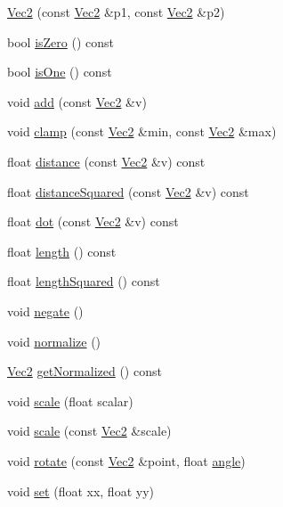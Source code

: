 \begin{DoxyCompactItemize}
\item 
\hyperlink{classVec2_aff34a0a8b960dcfbcc5ac1d8d3af3493}{Vec2} (const \hyperlink{classVec2}{Vec2} \&p1, const \hyperlink{classVec2}{Vec2} \&p2)
\item 
bool \hyperlink{classVec2_ad399155b1760c192c1afafdb5d7ccea3}{is\+Zero} () const
\item 
bool \hyperlink{classVec2_a3fad8b882142f8e96c4b50a2a8c5d1a6}{is\+One} () const
\item 
void \hyperlink{classVec2_a83705106dc5f7903512f26c09c317a21}{add} (const \hyperlink{classVec2}{Vec2} \&v)
\item 
void \hyperlink{classVec2_a5c3444068aab183f97eb5081b817748a}{clamp} (const \hyperlink{classVec2}{Vec2} \&min, const \hyperlink{classVec2}{Vec2} \&max)
\item 
float \hyperlink{classVec2_a95cf4ec6593042a5c19186828f53d146}{distance} (const \hyperlink{classVec2}{Vec2} \&v) const
\item 
float \hyperlink{classVec2_a5bf11958886ffb9d406a7d4e7eae4237}{distance\+Squared} (const \hyperlink{classVec2}{Vec2} \&v) const
\item 
float \hyperlink{classVec2_a0077f35f41e7499847b5332a0ce42438}{dot} (const \hyperlink{classVec2}{Vec2} \&v) const
\item 
float \hyperlink{classVec2_af9ebf7c8888fd5df9514e6d519b99fb2}{length} () const
\item 
float \hyperlink{classVec2_a5dbc5e767907b2e217060479c52777bb}{length\+Squared} () const
\item 
void \hyperlink{classVec2_a26074525e995a2085bd63d9a146f2e33}{negate} ()
\item 
void \hyperlink{classVec2_aa0b240c09b19c98d2d2fe462aca478cd}{normalize} ()
\item 
\hyperlink{classVec2}{Vec2} \hyperlink{classVec2_a1bcbcc58d94b67c58718f2415afad1be}{get\+Normalized} () const
\item 
void \hyperlink{classVec2_a67d98d1e2261ae9369bd79c337187cd8}{scale} (float scalar)
\item 
void \hyperlink{classVec2_ae2c74b30190869c962302065cfeecf8c}{scale} (const \hyperlink{classVec2}{Vec2} \&scale)
\item 
void \hyperlink{classVec2_acb4191c1852c73801734d10386722ccf}{rotate} (const \hyperlink{classVec2}{Vec2} \&point, float \hyperlink{classVec2_a8e791a6d3b657e714587295b6fc331b6}{angle})
\item 
void \hyperlink{classVec2_a74b21ca56da0a8db13168c627929ffd0}{set} (float xx, float yy)

\end{DoxyCompactItemize}
